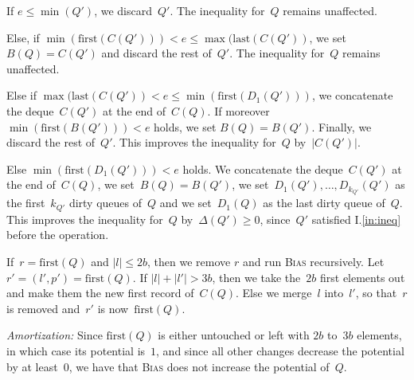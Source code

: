 \documentclass[]{article}
\newcommand{\first}{\text{first}}
\newcommand{\last}{\text{last}}
\newcommand{\iref}[1]{I.\ref{#1}}
\begin{document}
\begin{enumerate}[1)]
\begin{enumerate}[1)]
    If $e \leq \min(Q')$, we discard~$Q'$. The inequality for~$Q$ remains
    unaffected.

    Else, if $\min(\first(C(Q'))) < e \leq \max(\last (C(Q'))$, we set $B(Q) =
    C(Q')$ and discard the rest of~$Q'$. The inequality for~$Q$ remains
    unaffected.

    Else if $\max(\last(C(Q')) < e \leq \min(\first(D_1(Q')))$, we concatenate
    the deque~$C(Q')$ at the end of~$C(Q)$. If moreover $\min(\first(B(Q'))) <
    e$ holds, we set $B(Q) = B(Q')$. Finally, we discard the rest of~$Q'$. This
    improves the inequality for~$Q$ by~$|C(Q')|$.

    Else $\min(\first(D_1(Q'))) < e$ holds. We concatenate the deque~$C(Q')$ at
    the end of~$C(Q)$, we set~$B(Q) = B(Q')$, we
    set~$D_1(Q'),\ldots,D_{k_{Q'}}(Q')$ as the first~$k_{Q'}$ dirty queues
    of~$Q$ and we set~$D_1(Q)$ as the last dirty queue of~$Q$. This improves the
    inequality for~$Q$ by~$\Delta(Q') \geq 0$, since~$Q'$ satisfied
    \iref{in:ineq} before the operation.

    If~$r=\first(Q)$ and $|l| \leq 2b$, then we remove $r$ and run \textsc{Bias}
    recursively. Let $r' = (l',p') = \first(Q)$. If $|l| + |l'| > 3b$, then we
    take the~$2b$ first elements out and make them the new first record
    of~$C(Q)$. Else we merge~$l$ into~$l'$, so that~$r$ is removed and~$r'$ is
    now~$\first(Q)$.

    \textit{Amortization:} Since $\first(Q)$ is either untouched or left with
    $2b$ to~$3b$ elements, in which case its potential is~$1$, and since all
    other changes decrease the potential by at least~$0$, we have that
    \textsc{Bias} does not increase the potential of~$Q$.
  \end{enumerate}
\end{enumerate}
\end{document}
